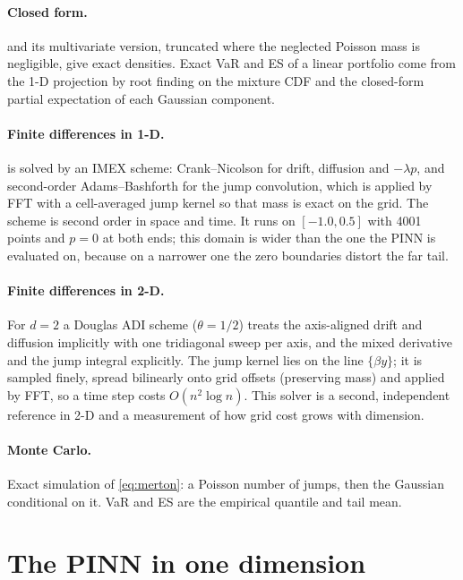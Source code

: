 \paragraph{Closed form.}  and its multivariate version, truncated where the neglected
Poisson mass is negligible, give exact densities. Exact VaR and ES of a linear portfolio come from the 1-D
projection by root finding on the mixture CDF and the closed-form partial expectation of each Gaussian
component.

\paragraph{Finite differences in 1-D.}  is solved by an IMEX scheme: Crank--Nicolson for
drift, diffusion and $-\lambda p$, and second-order Adams--Bashforth for the jump convolution, which is applied
by FFT with a cell-averaged jump kernel so that mass is exact on the grid. The scheme is second order in space
and time. It runs on $[-1.0, 0.5]$ with 4001 points and $p = 0$ at both ends; this domain is wider than the one
the PINN is evaluated on, because on a narrower one the zero boundaries distort the far tail.

\paragraph{Finite differences in 2-D.} For $d = 2$ a Douglas ADI scheme ($\theta = 1/2$) treats the
axis-aligned drift and diffusion implicitly with one tridiagonal sweep per axis, and the mixed derivative and
the jump integral explicitly. The jump kernel lies on the line $\{\beta y\}$; it is sampled finely, spread
bilinearly onto grid offsets (preserving mass) and applied by FFT, so a time step costs $O(n^2 \log n)$. This
solver is a second, independent reference in 2-D and a measurement of how grid cost grows with dimension.

\paragraph{Monte Carlo.} Exact simulation of \cref{eq:merton}: a Poisson number of jumps, then the
Gaussian conditional on it. VaR and ES are the empirical quantile and tail mean.

\section{The PINN in one dimension}
\label{sec:met-pinn1d}

